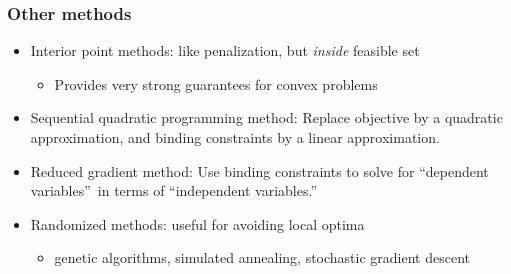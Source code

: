 \documentclass[bigger]{beamer}
\begin{document}
\begin{frame}%


\frametitle{Other methods}

\begin{itemize}

\item Interior point methods: like penalization, but \emph{inside} feasible set
\begin{itemize}
\item Provides very strong guarantees for convex problems
\end{itemize}
\item Sequential quadratic programming method: \newline
Replace objective by a quadratic approximation, \newline
and binding constraints by a linear approximation.
\item Reduced gradient method: Use binding constraints to solve for
\textquotedblleft dependent variables\textquotedblright\ in terms of
\textquotedblleft independent variables.\textquotedblright 


\item Randomized methods: useful for avoiding local optima 
\begin{itemize}
\item genetic algorithms, simulated annealing, stochastic gradient descent
\end{itemize}


\end{itemize}




\end{frame}%
\end{document}
